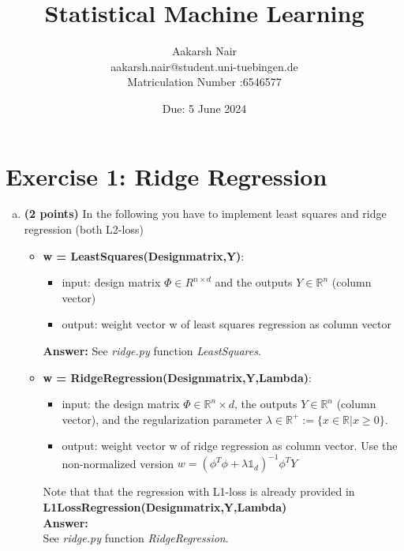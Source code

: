 \documentclass{./tufte-handout}
\title{Statistical Machine Learning}
\author[Aakarsh Nair]{Aakarsh Nair\\aakarsh.nair@student.uni-tuebingen.de  \\Matriculation Number :6546577 }
\date{Due: 5 June 2024}
\begin{document}
\maketitle

\section{Exercise 1: Ridge Regression}

\begin{enumerate}[(a)]
\item \textbf{(2 points)} In the following you have to implement least squares and ridge regression (both L2-loss)

\begin{itemize}
    \item \textbf{w = LeastSquares(Designmatrix,Y)}:
    \begin{itemize}
    \item  input: design matrix $\Phi \in R^{n  \times d}$ and the outputs $Y \in \mathbb{R}^n$ (column vector)
    \item output: weight vector w of least squares regression as column vector
    \end{itemize}

	\textbf{Answer:}
	See \emph{ridge.py} function \emph{ LeastSquares}. 
	
    \item  \textbf{w = RidgeRegression(Designmatrix,Y,Lambda)}:
    \begin{itemize}
        \item input: the design matrix $\Phi \in \mathbb{R}^n \times d$, the outputs 
        $Y \in \mathbb{R}^n$ (column vector), and the regularization
        parameter $\lambda \in \mathbb{R}^+ := \{x \in \mathbb{R}|x \geq 0\}$.
        \item output: weight vector w of ridge regression as column vector. Use the non-normalized version
        $w = {(\phi^T \phi + \lambda \mathbb{1}_d)}^{-1}\phi^T Y$ 
    \end{itemize}

       Note that that the regression with L1-loss is already provided in 
    \textbf{L1LossRegression(Designmatrix,Y,Lambda)}\\
    
    \textbf{Answer:} \\
    See \emph{ridge.py} function \emph{ RidgeRegression}. 
    
 
\end{itemize}




\end{enumerate}
\end{document}
